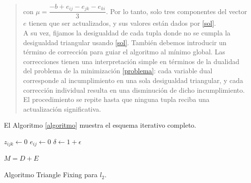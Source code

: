\documentclass[12pt]{report} %
\theoremstyle{definition}
\begin{document}
{\begin{quotation}
\noindent con $\mu = \dfrac{-b + e_{ij} - e_{jk} - e_{ki}}{3}$. Por lo tanto, solo tres componentes del vector $e$ tienen que ser actualizados, y sus valores están dados por \eqref{sol}. \\

A su vez, fijamos la desigualdad de cada tupla donde no se cumpla la desigualdad triangular usando \eqref{sol}. También debemos introducir un término de corrección para guiar el algoritmo al mínimo global. Las correcciones tienen una interpretación simple en términos de la dualidad del problema de la minimización \eqref{problema}: cada variable dual corresponde al incumplimiento en una sola desigualdad triangular, y cada corrección individual resulta en una disminución de dicho incumplimiento. El procedimiento se repite hasta que ninguna tupla reciba una actualización significativa.

\end{quotation}

El Algoritmo \ref{algoritmo} muestra el esquema iterativo completo.\\

\begin{algorithm}[H] \label{algoritmo}
	\SetAlgoLined
	
	{$z_{ijk} \leftarrow 0$}
	{$e_{ij} \leftarrow 0$}
	$\delta \leftarrow 1 + \epsilon$
	
\Return $M=D+E$
	\caption{Algoritmo Triangle Fixing para $l_2$.}
\end{algorithm}
 \vspace{0.5cm}

}
\end{document}
